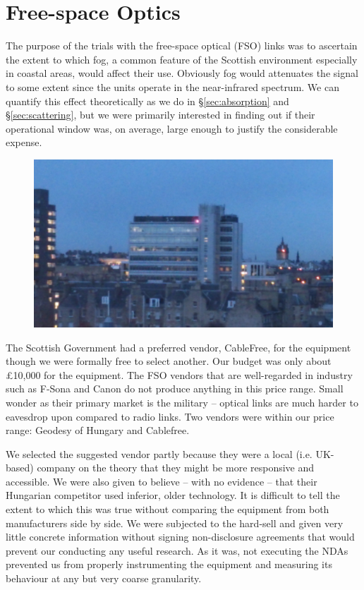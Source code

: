 
\section{Free-space Optics}
\label{sec:fso}

The purpose of the trials with the free-space optical (FSO) links was to
ascertain the extent to which fog, a common feature of the Scottish
environment especially in coastal areas, would affect their
use. Obviously fog would attenuates the signal to some extent since
the units operate in the near-infrared spectrum. We can quantify this
effect theoretically as we do in \S\ref{sec:absorption} and
\S\ref{sec:scattering},
but we were primarily interested in finding out if their operational
window was, on average, large enough to justify the considerable
expense.
\begin{figure}
  \includegraphics[width=\textwidth]{at-laser.jpg}
\end{figure}

The Scottish Government had a preferred vendor, CableFree, for the
equipment though we were formally free to select another. Our budget
was only about \pounds 10,000 for the equipment. The FSO vendors that
are well-regarded in industry such as F-Sona and Canon do not produce
anything in this price range. Small wonder as their primary market is
the military -- optical links are much harder to eavesdrop upon
compared to radio links. Two vendors were within our price range:
Geodesy of Hungary and Cablefree.

We selected the suggested vendor partly because they were a local
(i.e. UK-based) company on the theory that they might be more
responsive and accessible. We were also given to believe -- with no
evidence -- that their Hungarian competitor used inferior, older
technology. It is difficult to tell the extent to which this was
true without comparing the equipment from both manufacturers side by
side. We were subjected to the hard-sell and given very little
concrete information without signing non-disclosure agreements that
would prevent our conducting any useful research. As it was, not
executing the NDAs prevented us from properly instrumenting the
equipment and measuring its behaviour at any but very coarse
granularity.



